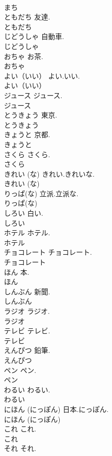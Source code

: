 \documentclass[8pt]{extreport}
\begin{document}
\begin{CJK}{UTF8}{min}
\\	まち
\\	ともだち		友達.	
\\	ともだち
\\	じどうしゃ		自動車.	
\\	じどうしゃ
\\	おちゃ		お茶.	
\\	おちゃ
\\	よい（いい）		よい.いい.	
\\	よい（いい）
\\	ジュース		ジュース.	
\\	ジュース
\\	とうきょう		東京.	
\\	とうきょう
\\	きょうと		京都.	
\\	きょうと
\\	さくら		さくら.	
\\	さくら
\\	きれい (な)		きれい.きれいな.	
\\	きれい (な)
\\	りっぱ(な)		立派.立派な.	
\\	りっぱ(な)
\\	しろい		白い.	
\\	しろい
\\	ホテル		ホテル.	
\\	ホテル
\\	チョコレート		チョコレート.	
\\	チョコレート
\\	ほん		本.	
\\	ほん
\\	しんぶん		新聞.	
\\	しんぶん
\\	ラジオ		ラジオ.	
\\	ラジオ
\\	テレビ		テレビ.	
\\	テレビ
\\	えんぴつ		鉛筆.	
\\	えんぴつ
\\	ペン		ペン.	
\\	ペン
\\	わるい		わるい.	
\\	わるい
\\	にほん (にっぽん)		日本.にっぽん.	
\\	にほん (にっぽん)
\\	これ		これ.	
\\	これ
\\	それ		それ.	

\end{CJK}
\end{document}
